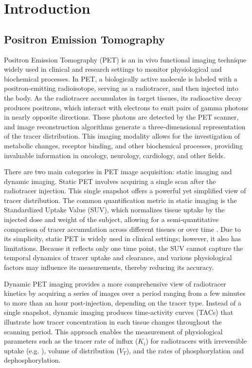 \chapter{Introduction}
\section{Positron Emission Tomography}
Positron Emission Tomography (PET) is an in vivo functional imaging technique widely used in clinical and research settings to monitor physiological and biochemical processes.
In PET, a biologically active molecule is labeled with a positron-emitting radioisotope, serving as a radiotracer, and then injected into the body.
As the radiotracer accumulates in target tissues, its radioactive decay produces positrons, which interact with electrons to emit pairs of gamma photons in nearly opposite directions.
These photons are detected by the PET scanner, and image reconstruction algorithms generate a three-dimensional representation of the tracer distribution.
This imaging modality allows for the investigation of metabolic changes, receptor binding, and other biochemical processes, providing invaluable information in oncology, neurology, cardiology, and other fields.

There are two main categories in PET image acquisition: static imaging and dynamic imaging.
Static PET involves acquiring a single scan after the radiotracer injection.
This single snapshot offers a powerful yet simplified view of tracer distribution.
The common quantification metric in static imaging is the Standardized Uptake Value (SUV), which normalizes tissue uptake by the injected dose and weight of the subject, allowing for a semi-quantitative comparison of tracer accumulation across different tissues or over time \cite{keyes1995suv}.
Due to its simplicity, static PET is widely used in clinical settings; however, it also has limitations.
Because it reflects only one time point, the SUV cannot capture the temporal dynamics of tracer uptake and clearance, and various physiological factors may influence its measurements, thereby reducing its accuracy.

Dynamic PET imaging provides a more comprehensive view of radiotracer kinetics by acquiring a series of images over a period ranging from a few minutes to more than an hour post-injection, depending on the tracer type.
Instead of a single snapshot, dynamic imaging produces time-activity curves (TACs) that illustrate how tracer concentration in each tissue changes throughout the scanning period.
This approach enables the measurement of physiological parameters such as the tracer rate of influx (\(K_i\)) for radiotracers with irreversible uptake (e.g. \fdg ), volume of distribution (\(V_T\)), and the rates of phosphorylation and dephosphorylation.


